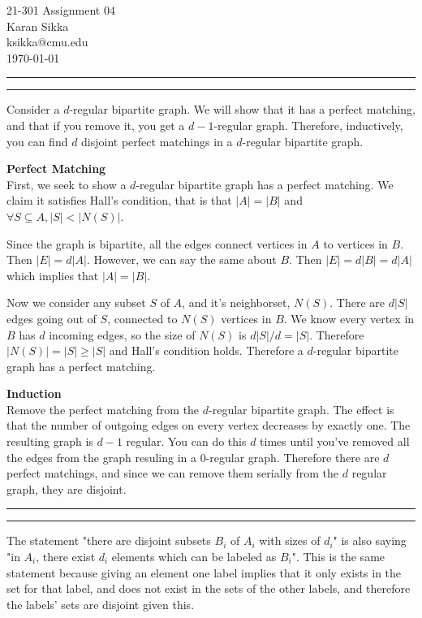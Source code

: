 \documentclass[11pt,letterpaper]{article}
\makeatletter
\newcommand{\question}[1] {\vspace{.25in} \hrule\vspace{0.5em}
\noindent{\bf #1} \vspace{0.5em}
\hrule \vspace{.10in}}
\newcommand{\myname}{Karan Sikka}
\newcommand{\myandrew}{ksikka@cmu.edu}
\newcommand{\myhwnum}{04}
\makeatother
\begin{document}
\medskip

\thispagestyle{plain}
\begin{center}                  %
{\Large 21-301 Assignment \myhwnum} \\
\myname \\
\myandrew \\
\today
\end{center}


\question{1}
Consider a $d$-regular bipartite graph. We will show that it has a perfect matching, and that if you remove it, you get a $d-1$-regular graph. Therefore, inductively, you can find $d$ disjoint perfect matchings in a $d$-regular bipartite graph.

\textbf{Perfect Matching}\\
First, we seek to show a $d$-regular bipartite graph has a perfect matching.
We claim it satisfies Hall's condition, that is that $|A| = |B|$ and
$\forall S \subseteq A , |S| < |N(S)|$.

Since the graph is bipartite, all the edges connect vertices in $A$ to vertices in $B$.
Then $|E| = d|A|$. However, we can say the same about $B$.
Then $|E| = d|B| = d|A|$ which implies that $|A| = |B|$.

Now we consider any subset $S$ of $A$, and it's neighborset, $N(S)$.
There are $d|S|$ edges going out of $S$, connected to $N(S)$ vertices in $B$.
We know every vertex in $B$ has $d$ incoming edges, so the size of $N(S)$ is $d|S|/d = |S|$.
Therefore $|N(S)| = |S| \geq |S|$ and Hall's condition holds. Therefore a $d$-regular bipartite graph has a perfect matching.

\textbf{Induction}\\
Remove the perfect matching from the $d$-regular bipartite graph. The effect is that the number of outgoing edges on every vertex decreases by exactly one.
The resulting graph is $d-1$ regular. You can do this $d$ times until you've removed all the edges from the graph resuling in a 0-regular graph.
Therefore there are $d$ perfect matchings, and since we can remove them serially from the $d$ regular graph, they are disjoint.

\question{2}
The statement "there are disjoint subsets $B_i$ of $A_i$ with sizes of $d_i$" is also saying "in $A_i$, there exist $d_i$ elements which can be labeled as $B_i$".
This is the same statement because giving an element one label implies that it only exists in the set for that label, and does not exist in the sets of the other labels, and therefore the labels' sets are disjoint given this.
\end{document}
